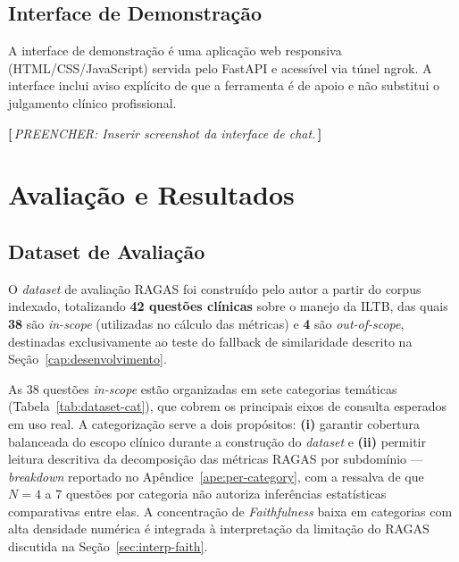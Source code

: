 \documentclass[
  12pt,
  oneside,
  a4paper,
  english,
  brazil
]{abntex2}
\newcommand{\aluno}[1]{{\color{olive!80!black}\textbf{[\,}{\small\itshape PREENCHER: #1}\textbf{\,]}}}
\begin{document}
\section{Interface de Demonstração}

A interface de demonstração é uma aplicação web responsiva (HTML/CSS/JavaScript)
servida pelo FastAPI e acessível via túnel ngrok. A interface inclui aviso explícito
de que a ferramenta é de apoio e não substitui o julgamento clínico profissional.

\aluno{Inserir screenshot da interface de chat.}

\chapter{Avaliação e Resultados}
\label{cap:avaliacao}

\section{Dataset de Avaliação}

O \textit{dataset} de avaliação RAGAS foi construído pelo autor a partir do corpus
indexado, totalizando \textbf{42 questões clínicas} sobre o manejo da ILTB, das
quais \textbf{38} são \textit{in-scope} (utilizadas no cálculo das métricas) e
\textbf{4} são \textit{out-of-scope}, destinadas exclusivamente ao teste do
fallback de similaridade descrito na Seção~\ref{cap:desenvolvimento}.

As 38 questões \textit{in-scope} estão organizadas em sete categorias temáticas
(Tabela~\ref{tab:dataset-cat}), que cobrem os principais eixos de consulta
esperados em uso real. A categorização serve a dois propósitos:
\textbf{(i)} garantir cobertura balanceada do escopo clínico durante a
construção do \textit{dataset} e \textbf{(ii)} permitir leitura descritiva
da decomposição das métricas RAGAS por subdomínio --- \emph{breakdown}
reportado no Apêndice~\ref{ape:per-category}, com a ressalva de que
$N=4$ a $7$ questões por categoria não autoriza inferências estatísticas
comparativas entre elas. A concentração de \textit{Faithfulness} baixa em
categorias com alta densidade numérica é integrada à interpretação da
limitação do RAGAS discutida na Seção~\ref{sec:interp-faith}.
\end{document}
